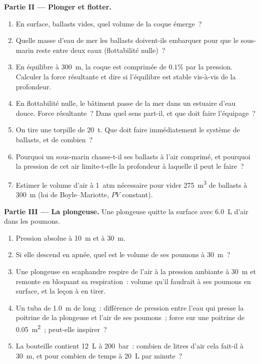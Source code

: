 \begin{problem}
\medskip
\noindent\textbf{Partie II --- Plonger et flotter.}
\begin{enumerate}[resume]
  \item En surface, ballasts vides, quel volume de la coque émerge~?
  \item Quelle masse d'eau de mer les ballasts doivent-ils embarquer pour
        que le sous-marin reste entre deux eaux (flottabilité nulle)~?
  \item En équilibre à \qty{300}{m}, la coque est comprimée de $0.1\%$ par
        la pression. Calculer la force résultante et dire si l'équilibre est
        stable vis-à-vis de la profondeur.
  \item En flottabilité nulle, le bâtiment passe de la mer dans un estuaire
        d'eau douce. Force résultante~? Dans quel sens part-il, et que doit
        faire l'équipage~?
  \item On tire une torpille de \qty{20}{t}. Que doit faire immédiatement le
        système de ballasts, et de combien~?
  \item Pourquoi un sous-marin chasse-t-il ses ballasts à l'air comprimé, et
        pourquoi la pression de cet air limite-t-elle la profondeur à
        laquelle il peut le faire~?
  \item Estimer le volume d'air à \qty{1}{atm} nécessaire pour vider
        \qty{275}{m^3} de ballasts à \qty{300}{m} (loi de Boyle--Mariotte,
        $PV$ constant).
\end{enumerate}

\medskip
\noindent\textbf{Partie III --- La plongeuse.}
Une plongeuse quitte la surface avec \qty{6.0}{L} d'air dans les poumons.
\begin{enumerate}[resume]
  \item Pression absolue à \qty{10}{m} et à \qty{30}{m}.
  \item Si elle descend en apnée, quel est le volume de ses poumons à
        \qty{30}{m}~?
  \item Une plongeuse en scaphandre respire de l'air à la pression ambiante
        à \qty{30}{m} et remonte en bloquant sa respiration~: volume qu'il
        faudrait à ses poumons en surface, et la leçon à en tirer.
  \item Un tuba de \qty{1.0}{m} de long~: différence de pression entre l'eau
        qui presse la poitrine de la plongeuse et l'air de ses poumons~;
        force sur une poitrine de \qty{0.05}{m^2}~; peut-elle inspirer~?
  \item La bouteille contient \qty{12}{L} à \qty{200}{bar}~: combien de litres
        d'air cela fait-il à \qty{30}{m}, et pour combien de temps à
        \qty{20}{L} par minute~?
\end{enumerate}


\end{problem}
